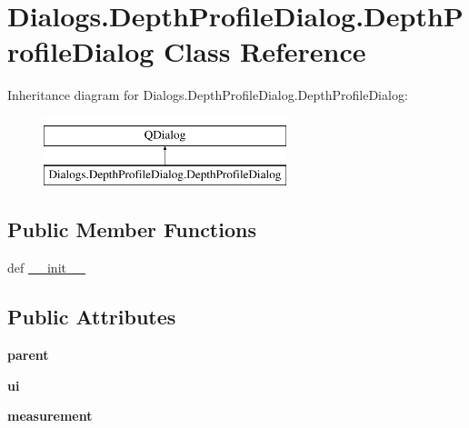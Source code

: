 \hypertarget{classDialogs_1_1DepthProfileDialog_1_1DepthProfileDialog}{\section{Dialogs.\-Depth\-Profile\-Dialog.\-Depth\-Profile\-Dialog Class Reference}
\label{classDialogs_1_1DepthProfileDialog_1_1DepthProfileDialog}
}
Inheritance diagram for Dialogs.\-Depth\-Profile\-Dialog.\-Depth\-Profile\-Dialog\-:\begin{figure}[H]
\begin{center}
\leavevmode
\includegraphics[height=2.000000cm]{classDialogs_1_1DepthProfileDialog_1_1DepthProfileDialog}
\end{center}
\end{figure}
\subsection*{Public Member Functions}
\begin{DoxyCompactItemize}
\item 
def \hyperlink{classDialogs_1_1DepthProfileDialog_1_1DepthProfileDialog_a4caa83268490c73b1e7dc6a645f7282f}{\-\_\-\-\_\-init\-\_\-\-\_\-}
\end{DoxyCompactItemize}
\subsection*{Public Attributes}
\begin{DoxyCompactItemize}
\item 
\hypertarget{classDialogs_1_1DepthProfileDialog_1_1DepthProfileDialog_ae56f240cae99a2e587e35694bab3cde8}{{\bfseries parent}}\label{classDialogs_1_1DepthProfileDialog_1_1DepthProfileDialog_ae56f240cae99a2e587e35694bab3cde8}

\item 
\hypertarget{classDialogs_1_1DepthProfileDialog_1_1DepthProfileDialog_a26b6f749f5342f7739c8864708d9a887}{{\bfseries ui}}\label{classDialogs_1_1DepthProfileDialog_1_1DepthProfileDialog_a26b6f749f5342f7739c8864708d9a887}

\item 
\hypertarget{classDialogs_1_1DepthProfileDialog_1_1DepthProfileDialog_af4c3f3175238254743d40c8a80cc5f01}{{\bfseries measurement}}\label{classDialogs_1_1DepthProfileDialog_1_1DepthProfileDialog_af4c3f3175238254743d40c8a80cc5f01}

\end{DoxyCompactItemize}
